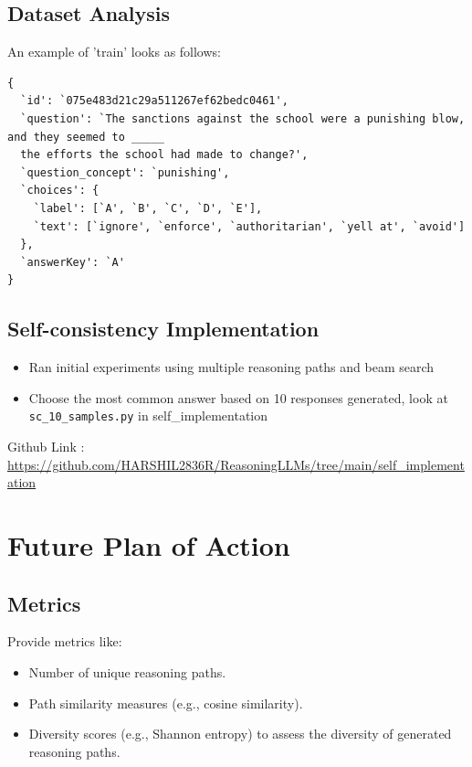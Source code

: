 \documentclass[24pt]{article}
\begin{document}
\subsection{Dataset Analysis}
An example of 'train' looks as follows:
\begin{verbatim}
{
  `id': `075e483d21c29a511267ef62bedc0461',
  `question': `The sanctions against the school were a punishing blow, and they seemed to _____ 
  the efforts the school had made to change?',
  `question_concept': `punishing',
  `choices': {
    `label': [`A', `B', `C', `D', `E'],
    `text': [`ignore', `enforce', `authoritarian', `yell at', `avoid']
  },
  `answerKey': `A'
}
\end{verbatim}


\subsection{Self-consistency Implementation} 
\begin{itemize}
    \item Ran initial experiments using multiple reasoning paths and beam search
    \item Choose the most common answer based on 10 responses generated, look at \texttt{sc\_10\_samples.py} in self\_implementation
\end{itemize}

\noindent
Github Link : \url{https://github.com/HARSHIL2836R/ReasoningLLMs/tree/main/self_implementation}\\




\section{Future Plan of Action}

\subsection{Metrics}
Provide metrics like:
\begin{itemize}
    \item Number of unique reasoning paths.
    \item Path similarity measures (e.g., cosine similarity).
    \item Diversity scores (e.g., Shannon entropy) to assess the diversity of generated reasoning paths.
\end{itemize}
\end{document}

